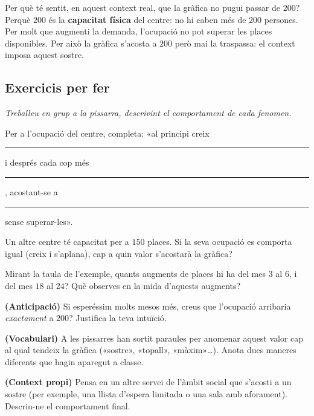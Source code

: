 \begin{exresolt}
Per què té sentit, en aquest context real, que la gràfica no pugui passar de $200$?
\solucio
Perquè $200$ és la \textbf{capacitat física} del centre: no hi caben més de $200$
persones. Per molt que augmenti la demanda, l'ocupació no pot superar les places
disponibles. Per això la gràfica s'acosta a $200$ però mai la traspassa: el context
imposa aquest sostre.
\end{exresolt}

\subsection{Exercicis per fer}

\noindent\textit{Treballeu en grup a la pissarra, descrivint el comportament de cada
fenomen.}

\begin{exercicis}
\begin{exlist}
  \item Per a l'ocupació del centre, completa: «al principi creix \rule{2cm}{0.4pt} i
        després cada cop més \rule{2cm}{0.4pt}, acostant-se a \rule{1.5cm}{0.4pt} sense
        superar-les».
  \item Un altre centre té capacitat per a $150$ places. Si la seva ocupació es comporta
        igual (creix i s'aplana), cap a quin valor s'acostarà la gràfica?
  \item Mirant la taula de l'exemple, quants augments de places hi ha del mes $3$ al
        $6$, i del mes $18$ al $24$? Què observes en la mida d'aquests augments?
  \item \textbf{(Anticipació)} Si esperéssim molts mesos més, creus que l'ocupació
        arribaria \emph{exactament} a $200$? Justifica la teva intuïció.
  \item \textbf{(Vocabulari)} A les pissarres han sortit paraules per anomenar aquest
        valor cap al qual tendeix la gràfica («sostre», «topall», «màxim»\dots). Anota
        dues maneres diferents que hagin aparegut a classe.
  \item \textbf{(Context propi)} Pensa en un altre servei de l'àmbit social que
        s'acosti a un sostre (per exemple, una llista d'espera limitada o una sala amb
        aforament). Descriu-ne el comportament final.
\end{exlist}
\end{exercicis}

